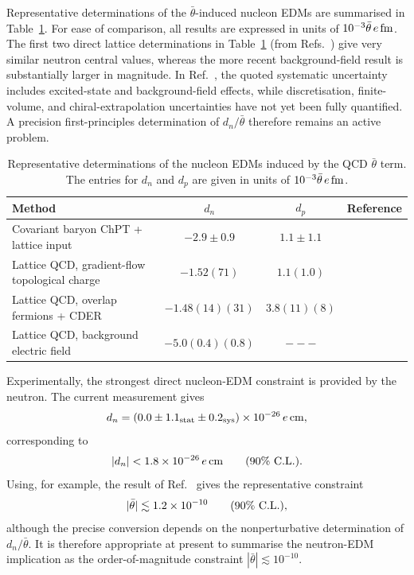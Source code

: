 \documentclass[review]{elsarticle}
\numberwithin{equation}{section}
\numberwithin{table}{section}
\numberwithin{figure}{section}
\begin{document}
Representative determinations of the $\bar\theta$-induced nucleon EDMs are summarised in Table~\ref{tab:nucleon-edm-theory}. For ease of comparison, all results are expressed in units of $10^{-3}\bar\theta\,e\,{\rm fm}$. The first two direct lattice determinations in Table~\ref{tab:nucleon-edm-theory} (from Refs.~\cite{Dragos:2019oxn,Liang:2023jfj}) give very similar neutron central values, whereas the more recent background-field result is substantially larger in magnitude. In Ref.~\cite{Blum:2026hul}, the quoted systematic uncertainty includes excited-state and background-field effects, while discretisation, finite-volume, and chiral-extrapolation uncertainties have not yet been fully quantified. A precision first-principles determination of $d_n/\bar\theta$ therefore remains an active problem.

\begin{table}[t]
\centering
\begin{tabular}{lccc}
\hline
Method & $d_n$ & $d_p$ & Reference\\
\hline\hline
Covariant baryon ChPT + lattice input & $-2.9\pm0.9$ & $1.1\pm1.1$ & \cite{Guo:2012vf} \\
Lattice QCD, gradient-flow topological charge & $-1.52(71)$ & $1.1(1.0)$ & \cite{Dragos:2019oxn} \\
Lattice QCD, overlap fermions + CDER & $-1.48(14)(31)$ & $3.8(11)(8)$ & \cite{Liang:2023jfj} \\
Lattice QCD, background electric field & $-5.0(0.4)(0.8)$ & $---$ & \cite{Blum:2026hul} \\
\hline
\end{tabular}
\caption{Representative determinations of the nucleon EDMs induced by the QCD $\bar\theta$ term. The entries for $d_n$ and $d_p$ are given in units of $10^{-3}\bar\theta\,e\,{\rm fm}$. }
\label{tab:nucleon-edm-theory}
\end{table}

Experimentally, the strongest direct nucleon-EDM constraint is provided by the neutron. The current measurement gives~\cite{Abel:2020pzs}
\begin{align}
    d_n = \left( 0.0\pm1.1_{\rm stat}\pm0.2_{\rm sys}
    \right) \times10^{-26}\,e\,{\rm cm},
\end{align}
corresponding to
\begin{align}
    |d_n| < 1.8\times10^{-26}\,e\,{\rm cm}
    \qquad
    (90\%~{\rm C.L.}).
    \label{eq:neutron-edm-bound}
\end{align}
Using, for example, the result of Ref.~\cite{Liang:2023jfj} gives the representative constraint~\cite{Mulder:2025esr}
\begin{align}
    |\bar\theta|
    \lesssim
    1.2\times10^{-10}
    \qquad
    (90\%~{\rm C.L.}),
    \label{eq:theta-bound-neutron}
\end{align}
although the precise conversion depends on the nonperturbative determination of $d_n/\bar\theta$. It is therefore appropriate at present to summarise the neutron-EDM implication as the order-of-magnitude constraint $|\bar\theta|\lesssim10^{-10}$.
\end{document}
